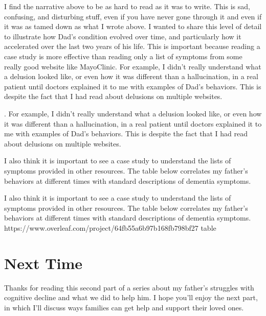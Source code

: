 \documentclass{article}
\begin{document}
I find the narrative above to be as hard to read as it was to write. This is sad, confusing, and disturbing stuff, even if you have never gone through it and even if it was as tamed down as what I wrote above. I wanted to share this level of detail to illustrate how Dad's condition evolved over time, and particularly how it accelerated over the last two years of his life. This is important because reading a case study is more effective than reading only a list of symptoms from some really good website like MayoClinic. For example, I didn't really understand what a delusion looked like, or even how it was different than a hallucination, in a real patient until doctors explained it to me with examples of Dad's behaviors. This is despite the fact that I had read about delusions on multiple websites.

. For example, I didn't really understand what a delusion looked like, or even how it was different than a hallucination, in a real patient until doctors explained it to me with examples of Dad's behaviors. This is despite the fact that I had read about delusions on multiple websites.


I also think it is important to see a case study to understand the lists of symptoms provided in other resources.  The table below correlates my father's behaviors at different times with standard descriptions of dementia symptoms. 





I also think it is important to see a case study to understand the lists of symptoms provided in other resources.  The table below correlates my father's behaviors at different times with standard descriptions of dementia symptoms. 
https://www.overleaf.com/project/64fb55a6b97b168fb798bf27
table

\section*{Next Time}

Thanks for reading this second part of a series about my father’s struggles with cognitive decline and what we did to help him. I hope you’ll enjoy the next part, in which I'll discuss ways families can get help and support their loved ones.

\end{document}
